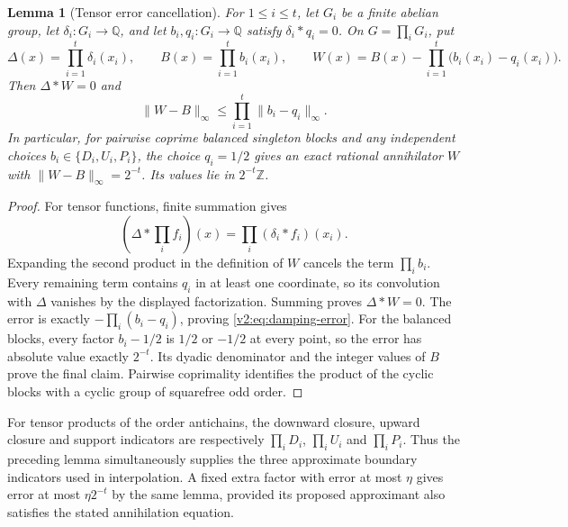 \documentclass[11pt]{article}
\numberwithin{equation}{section}
\newtheorem{lemma}[theorem]{Lemma}
\theoremstyle{definition}
\theoremstyle{remark}
\begin{document}
\begin{lemma}[Tensor error cancellation]\label{v2:lem:tensor-damping}
For $1\le i\le t$, let $G_i$ be a finite abelian group, let
$\delta_i:G_i\to\mathbb Q$, and let $b_i,q_i:G_i\to\mathbb Q$ satisfy
$\delta_i*q_i=0$.  On $G=\prod_iG_i$, put
\[
 \Delta(x)=\prod_{i=1}^t\delta_i(x_i),\qquad
 B(x)=\prod_{i=1}^tb_i(x_i),\qquad
 W(x)=B(x)-\prod_{i=1}^t\bigl(b_i(x_i)-q_i(x_i)\bigr).
\]
Then $\Delta*W=0$ and
\begin{equation}\label{v2:eq:damping-error}
 \|W-B\|_\infty\le
       \prod_{i=1}^t\|b_i-q_i\|_\infty.
\end{equation}
In particular, for pairwise coprime balanced singleton blocks and any
independent choices $b_i\in\{D_i,U_i,P_i\}$, the choice $q_i=1/2$ gives
an exact rational annihilator $W$ with
$\|W-B\|_\infty=2^{-t}$.  Its values lie in $2^{-t}\mathbb Z$.
\end{lemma}
\begin{proof}
For tensor functions, finite summation gives
\[
 (\Delta*\textstyle\prod_i f_i)(x)
      =\prod_i(\delta_i*f_i)(x_i).
\]
Expanding the second product in the definition of $W$ cancels the term
$\prod_i b_i$.  Every remaining term contains $q_i$ in at least one
coordinate, so its convolution with $\Delta$ vanishes by the displayed
factorization.  Summing proves $\Delta*W=0$.  The error is exactly
$-\prod_i(b_i-q_i)$, proving \eqref{v2:eq:damping-error}.
For the balanced blocks, every factor $b_i-1/2$ is $1/2$ or $-1/2$ at
every point, so the error has absolute value exactly $2^{-t}$.
Its dyadic denominator and the integer values of $B$ prove the final
claim.  Pairwise coprimality identifies the product of the cyclic blocks
with a cyclic group of squarefree odd order.
\end{proof}

For tensor products of the order antichains, the downward closure,
upward closure and support indicators are respectively
$\prod_iD_i$, $\prod_iU_i$ and $\prod_iP_i$.  Thus the preceding lemma
simultaneously supplies the three approximate boundary indicators used
in interpolation.  A fixed extra factor with error at most $\eta$ gives
error at most $\eta2^{-t}$ by the same lemma, provided its proposed
approximant also satisfies the stated annihilation equation.
\end{document}
